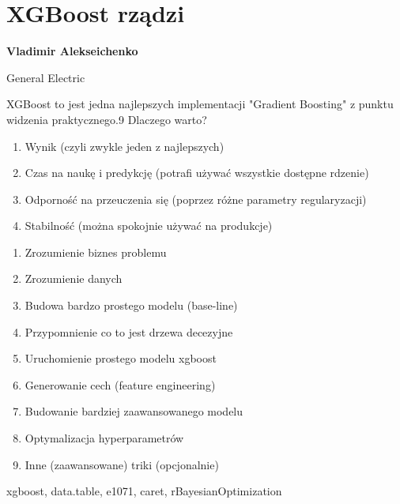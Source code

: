 \documentclass[\main/boa.tex]{subfiles}
\begin{document}
\section{XGBoost rządzi}

\begin{minipage}{0.915\textwidth}
\centering
{\bf {} Vladimir Alekseichenko}
\end{minipage}

\vskip 0.3cm

\begin{affiliations}
\begin{minipage}{0.915\textwidth}
\centering
\large General Electric \\[2pt]
\end{minipage}
\end{affiliations}

\vskip 0.8cm

\opiswarsztatu XGBoost to jest jedna najlepszych implementacji "Gradient Boosting" z punktu widzenia praktycznego.9
Dlaczego warto?
\begin{enumerate}
	\item Wynik (czyli zwykle jeden z najlepszych)
	\item Czas na naukę i predykcję (potrafi używać wszystkie dostępne rdzenie)
	\item Odporność na przeuczenia się (poprzez różne parametry regularyzacji)
	\item Stabilność (można spokojnie używać na produkcje)
\end{enumerate}

\planwarsztatu
\begin{enumerate}
\item Zrozumienie biznes problemu
\item Zrozumienie danych
\item Budowa bardzo prostego modelu (base-line)
\item Przypomnienie co to jest drzewa decezyjne
\item Uruchomienie prostego modelu xgboost
\item Generowanie cech (feature engineering)
\item Budowanie bardziej zaawansowanego modelu
\item Optymalizacja hyperparametrów
\item Inne (zaawansowane) triki (opcjonalnie)
\end{enumerate}	 

\pakiety xgboost, data.table, e1071, caret, rBayesianOptimization
\end{document}
